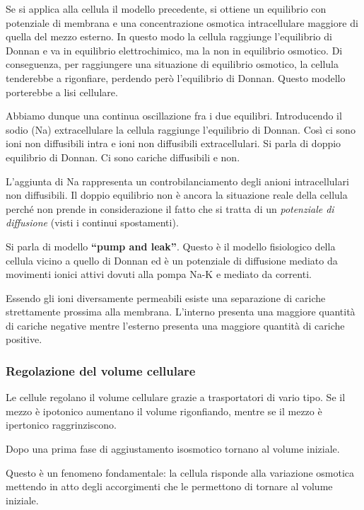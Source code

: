 \documentclass[]{article}
\begin{document}
Se si applica alla cellula il modello precedente, si ottiene un
equilibrio con potenziale di membrana e una concentrazione osmotica
intracellulare maggiore di quella del mezzo esterno. In questo modo la
cellula raggiunge l'equilibrio di Donnan e va in equilibrio
elettrochimico, ma la non in equilibrio osmotico. Di conseguenza, per
raggiungere una situazione di equilibrio osmotico, la cellula tenderebbe
a rigonfiare, perdendo però l'equilibrio di Donnan. Questo modello
porterebbe a lisi cellulare.

Abbiamo dunque una continua oscillazione fra i due equilibri.
Introducendo il sodio (Na) extracellulare la cellula raggiunge
l'equilibrio di Donnan. Così ci sono ioni non diffusibili intra e ioni
non diffusibili extracellulari. Si parla di doppio equilibrio di Donnan.
Ci sono cariche diffusibili e non.

L'aggiunta di Na rappresenta un controbilanciamento degli anioni
intracellulari non diffusibili. Il doppio equilibrio non è ancora la
situazione reale della cellula perché non prende in considerazione il
fatto che si tratta di un \emph{potenziale di diffusione} (visti i
continui spostamenti).

Si parla di modello \textbf{``pump and leak''}. Questo è il modello
fisiologico della cellula vicino a quello di Donnan ed è un potenziale
di diffusione mediato da movimenti ionici attivi dovuti alla pompa Na-K
e mediato da correnti.

Essendo gli ioni diversamente permeabili esiste una separazione di
cariche strettamente prossima alla membrana. L'interno presenta una
maggiore quantità di cariche negative mentre l'esterno presenta una
maggiore quantità di cariche positive.

\subsubsection{Regolazione del volume
cellulare}\label{regolazione-del-volume-cellulare}

Le cellule regolano il volume cellulare grazie a trasportatori di vario
tipo. Se il mezzo è ipotonico aumentano il volume rigonfiando, mentre se
il mezzo è ipertonico raggrinziscono.

Dopo una prima fase di aggiustamento isosmotico tornano al volume
iniziale.

Questo è un fenomeno fondamentale: la cellula risponde alla variazione
osmotica mettendo in atto degli accorgimenti che le permettono di
tornare al volume iniziale.
\end{document}
